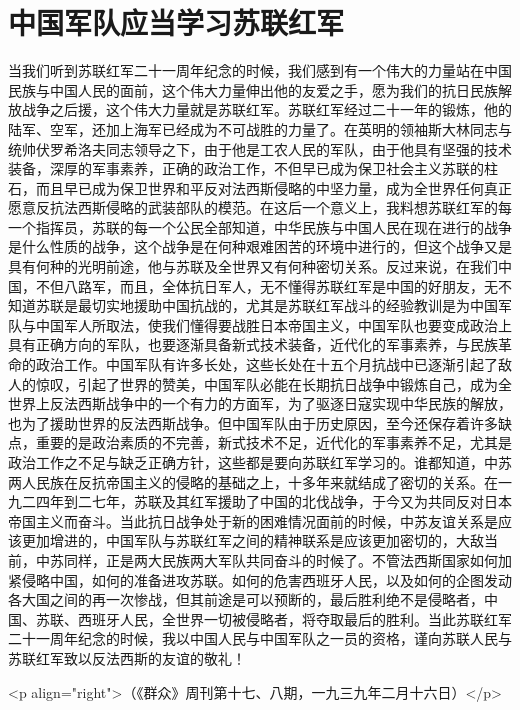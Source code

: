 \section[中国军队应当学习苏联红军（一九三九年二月二十三日）]{中国军队应当学习苏联红军}


当我们听到苏联红军二十一周年纪念的时候，我们感到有一个伟大的力量站在中国民族与中国人民的面前，这个伟大力量伸出他的友爱之手，愿为我们的抗日民族解放战争之后援，这个伟大力量就是苏联红军。苏联红军经过二十一年的锻炼，他的陆军、空军，还加上海军已经成为不可战胜的力量了。在英明的领袖斯大林同志与统帅伏罗希洛夫同志领导之下，由于他是工农人民的军队，由于他具有坚强的技术装备，深厚的军事素养，正确的政治工作，不但早已成为保卫社会主义苏联的柱石，而且早已成为保卫世界和平反对法西斯侵略的中坚力量，成为全世界任何真正愿意反抗法西斯侵略的武装部队的模范。在这后一个意义上，我料想苏联红军的每一个指挥员，苏联的每一个公民全部知道，中华民族与中国人民在现在进行的战争是什么性质的战争，这个战争是在何种艰难困苦的环境中进行的，但这个战争又是具有何种的光明前途，他与苏联及全世界又有何种密切关系。反过来说，在我们中国，不但八路军，而且，全体抗日军人，无不懂得苏联红军是中国的好朋友，无不知道苏联是最切实地援助中国抗战的，尤其是苏联红军战斗的经验教训是为中国军队与中国军人所取法，使我们懂得要战胜日本帝国主义，中国军队也要变成政治上具有正确方向的军队，也要逐渐具备新式技术装备，近代化的军事素养，与民族革命的政治工作。中国军队有许多长处，这些长处在十五个月抗战中已逐渐引起了敌人的惊叹，引起了世界的赞美，中国军队必能在长期抗日战争中锻炼自己，成为全世界上反法西斯战争中的一个有力的方面军，为了驱逐日寇实现中华民族的解放，也为了援助世界的反法西斯战争。但中国军队由于历史原因，至今还保存着许多缺点，重要的是政治素质的不完善，新式技术不足，近代化的军事素养不足，尤其是政治工作之不足与缺乏正确方针，这些都是要向苏联红军学习的。谁都知道，中苏两人民族在反抗帝国主义的侵略的基础之上，十多年来就结成了密切的关系。在一九二四年到二七年，苏联及其红军援助了中国的北伐战争，于今又为共同反对日本帝国主义而奋斗。当此抗日战争处于新的困难情况面前的时候，中苏友谊关系是应该更加增进的，中国军队与苏联红军之间的精神联系是应该更加密切的，大敌当前，中苏同样，正是两大民族两大军队共同奋斗的时候了。不管法西斯国家如何加紧侵略中国，如何的准备进攻苏联。如何的危害西班牙人民，以及如何的企图发动各大国之间的再一次惨战，但其前途是可以预断的，最后胜利绝不是侵略者，中国、苏联、西班牙人民，全世界一切被侵略者，将夺取最后的胜利。当此苏联红军二十一周年纪念的时候，我以中国人民与中国军队之一员的资格，谨向苏联人民与苏联红军致以反法西斯的友谊的敬礼！

<p align="right">（《群众》周刊第十七、八期，一九三九年二月十六日）</p>

